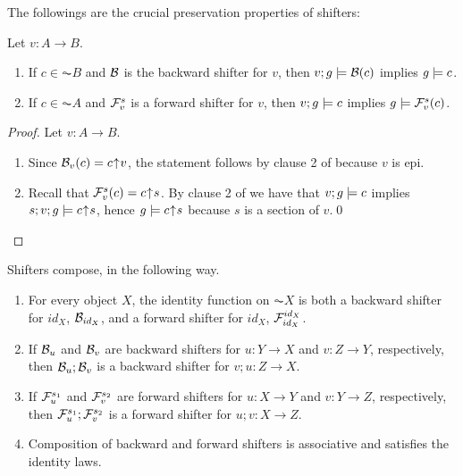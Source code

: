 The followings are the crucial preservation properties of shifters:
%
\begin{proposition}
Let $v:A\to B$.
\begin{enumerate}[topsep=\smallskipamount]
\item If $c\in \AC B$ and $\mathcal{B}$ is the backward  shifter for $v$, then $v;g\models \mathcal{B}(c)$ implies $g\models c$.
\item If $c\in \AC A$ and $\mathcal{F}^s_v$ is a forward shifter for $v$, then $v;g\models c$ implies $g\models \mathcal{F}^s_v(c)$.
\end{enumerate}
\end{proposition}
%
\begin{fullorname}
\begin{proof}
Let $v:A\to B$.
\begin{enumerate}
\item Since $\mathcal{B}_v(c)= {c}{\mskip1mu\uparrow\mskip1mu}{v}$, the statement follows by clause 2 of  because $v$ is epi.
\item Recall that $\mathcal{F}^s_v(c) = {c}{\mskip1mu\uparrow\mskip1mu}{s}$. By clause 2 of  we have that $v;g \models c$ implies $s;v;g \models {c}{\mskip1mu\uparrow\mskip1mu}{s}$, hence $g\models {c}{\mskip1mu\uparrow\mskip1mu}{s}$ because $s$ is a section of $v$.\qed
\end{enumerate}
\end{proof}
\end{fullorname}
% 
Shifters compose, in the following way.
%
\begin{proposition}
\begin{enumerate}[topsep=\smallskipamount]
\item For every object $X$, the identity function on $\AC{X}$ is both a backward shifter for $id_X$, $\mathcal{B}_{id_X}$, and a forward shifter for $id_X$, $\mathcal{F}^{id_X}_{id_X}$.
\item If $\mathcal{B}_u$ and $\mathcal{B}_v$ are backward  shifters for $u: Y\to X$ and $v: Z \to Y$, respectively, then $\mathcal{B}_u;\mathcal{B}_v$ is a backward shifter for $v;u: Z \to X$.
\item If $\mathcal{F}^{s_1}_u$ and $\mathcal{F}^{s_2}_v$ are forward shifters for $u: X\to Y$ and $v: Y \to Z$, respectively, then $\mathcal{F}^{s_1}_u;\mathcal{F}^{s_2}_v$ is a forward shifter for $u;v: X \to Z$.
\item Composition of backward and forward shifters is associative and satisfies the identity laws.
\end{enumerate}
\end{proposition}

